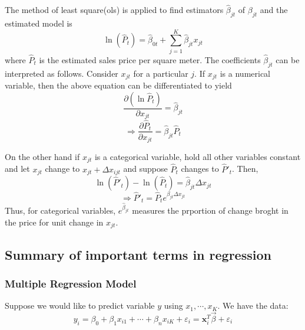 \documentclass[12pt]{article}
\begin{document}
The method of least square(\acrshort{ols}) is applied to find estimators $\hat \beta_{jt}$ of $\beta_{jt}$ and the estimated model is
$$\ln (\hat P_{t})=\hat \beta_{0t}+\sum_{j=1} ^{K} \hat \beta_{jt}x_{jt}$$
where $\hat P_{t}$ is the estimated sales price per square meter.
The coefficients $\hat \beta_{jt}$ can be interpreted as follows. Consider $x_{jt}$ for a particular $j$. If $x_{jt}$ is a numerical variable, then the above equation can be differentiated to yield 
$$\frac{\partial (\ln \hat P_{t})}{\partial x_{jt}}=\hat \beta_{jt}$$
$$\Rightarrow \frac{\partial \hat P_{t}}{\partial x_{jt}}=\hat \beta_{jt} \hat P_{t}$$

On the other hand if $x_{jt}$ is a categorical variable, hold all other variables constant and let $x_{jt}$ change to $x_{jt}+\Delta x_{ijt}$ and suppose $\hat P_t$ changes to $\hat P'_t$. Then, 
$$\ln(\hat P'_t)-\ln(\hat P_t)=\hat \beta_{jt}\Delta x_{jt}$$
$$\Rightarrow \hat P'_t=\hat P_t e^{\beta_{jt}\Delta x_{jt}}$$
Thus, for categorical variables, $e^{\hat \beta_{jt}}$ measures the prportion of change broght in the price for unit change in $x_{jt}$.

\subsection{Summary of important terms in regression}
\subsubsection{Multiple Regression Model}
Suppose we would like to predict variable $y$ using $x_1, \cdots, x_K$. We have the data:
$$y_i=\beta_0+\beta_1 x_{i1}+\cdots +\beta_n x_{iK}+\varepsilon_i={\textbf{x}_i^T\vec \beta}+\varepsilon_i$$
\end{document}
